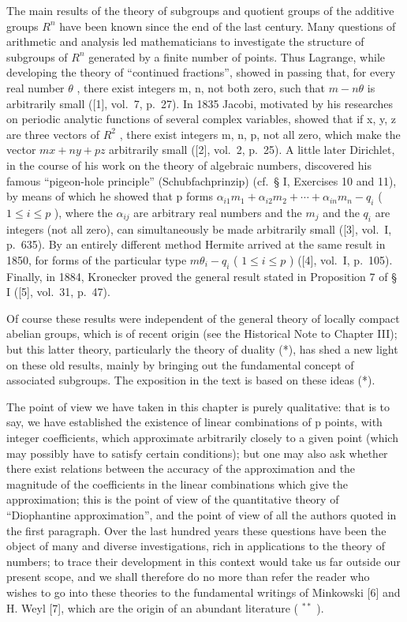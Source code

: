 The main results of the theory of subgroups and quotient groups of the additive groups \(R^{n}\) have been known since the end of the last century. Many questions of arithmetic and analysis led mathematicians to investigate the structure of subgroups of \(R^{n}\) generated by a finite number of points. Thus Lagrange, while developing the theory of ``continued fractions'', showed in passing that, for every real number \(\theta\) , there exist integers m, n, not both zero, such that \(m - n\theta\) is arbitrarily small ({[}1{]}, vol.~7, p.~27). In 1835 Jacobi, motivated by his researches on periodic analytic functions of several complex variables, showed that if x, y, z are three vectors of \(R^{2}\) , there exist integers m, n, p, not all zero, which make the vector \(mx + ny + pz\) arbitrarily small ({[}2{]}, vol.~2, p.~25). A little later Dirichlet, in the course of his work on the theory of algebraic numbers, discovered his famous ``pigeon-hole principle'' (Schubfachprinzip) (cf.~§ I, Exercises 10 and 11), by means of which he showed that p forms \(\alpha_{i1}m_{1} + \alpha_{i2}m_{2} + \cdots + \alpha_{in}m_{n} - q_{i}\) ( \(1 \leqslant i \leqslant p\) ), where the \(\alpha_{ij}\) are arbitrary real numbers and the \(m_{j}\) and the \(q_{i}\) are integers (not all zero), can simultaneously be made arbitrarily small ({[}3{]}, vol.~I, p.~635). By an entirely different method Hermite arrived at the same result in 1850, for forms of the particular type \(m\theta_{i} - q_{i}\) ( \(1 \leqslant i \leqslant p\) ) ({[}4{]}, vol.~I, p.~105). Finally, in 1884, Kronecker proved the general result stated in Proposition 7 of § I ({[}5{]}, vol.~31, p.~47).

Of course these results were independent of the general theory of locally compact abelian groups, which is of recent origin (see the Historical Note to Chapter III); but this latter theory, particularly the theory of duality (*), has shed a new light on these old results, mainly by bringing out the fundamental concept of associated subgroups. The exposition in the text is based on these ideas (*).

The point of view we have taken in this chapter is purely qualitative: that is to say, we have established the existence of linear combinations of p points, with integer coefficients, which approximate arbitrarily closely to a given point (which may possibly have to satisfy certain conditions); but one may also ask whether there exist relations between the accuracy of the approximation and the magnitude of the coefficients in the linear combinations which give the approximation; this is the point of view of the quantitative theory of ``Diophantine approximation'', and the point of view of all the authors quoted in the first paragraph. Over the last hundred years these questions have been the object of many and diverse investigations, rich in applications to the theory of numbers; to trace their development in this context would take us far outside our present scope, and we shall therefore do no more than refer the reader who wishes to go into these theories to the fundamental writings of Minkowski {[}6{]} and H. Weyl {[}7{]}, which are the origin of an abundant literature ( \(^{**}\) ).

